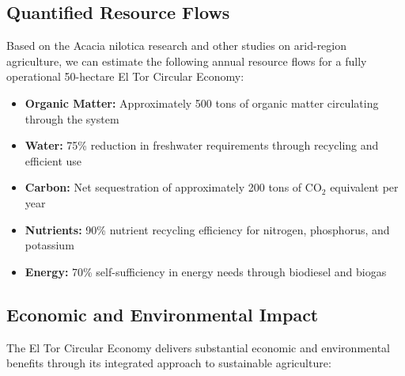 \subsection{Quantified Resource Flows}

Based on the Acacia nilotica research and other studies on arid-region agriculture, we can estimate the following annual resource flows for a fully operational 50-hectare El Tor Circular Economy:

\begin{itemize}
    \item \textbf{Organic Matter:} Approximately 500 tons of organic matter circulating through the system
    \item \textbf{Water:} 75\% reduction in freshwater requirements through recycling and efficient use
    \item \textbf{Carbon:} Net sequestration of approximately 200 tons of CO$_2$ equivalent per year
    \item \textbf{Nutrients:} 90\% nutrient recycling efficiency for nitrogen, phosphorus, and potassium
    \item \textbf{Energy:} 70\% self-sufficiency in energy needs through biodiesel and biogas
\end{itemize}

\subsection{Economic and Environmental Impact}

The El Tor Circular Economy delivers substantial economic and environmental benefits through its integrated approach to sustainable agriculture:

